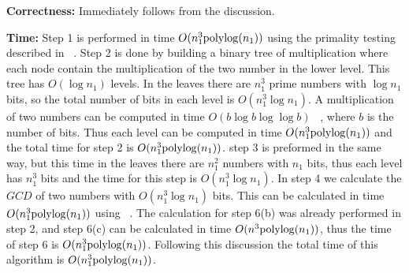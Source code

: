 \documentclass[11pt,amssymb]{article}
\begin{document}

{\bf Correctness:} Immediately follows from the discussion.

{\bf Time:} Step 1 is performed in time $O(n_1^3 {\rm polylog}(n_1))$
using the primality testing described in ~\cite{berri:02}. Step 2 is
done by building a binary tree of multiplication where each node
contain the multiplication of the two number in the lower level. This
tree has $O(\log n_1)$ levels. In the leaves there are $n_1^3$ prime
numbers with $\log n_1$ bits, so the total number of bits in each
level is $O(n_1^3 \log n_1)$. A multiplication of two numbers can be
computed in time $O(b \log b \log \log b)$ ~\cite{SS-71}, where $b$ is
the number of bits. Thus each level can be computed in time $O(n_1^3
{\rm polylog} (n_1))$ and the total time for step 2 is $O(n_1^3
{\rm polylog}(n_1))$. step 3 is preformed in the same way, but this time
in the leaves there are $n_1^2$ numbers with $n_1$ bits, thus each
level has $n_1^3$ bits and the time for this step is $O(n_1^3 \log
n_1)$. In step 4 we calculate the $GCD$ of two numbers with $O(n_1^3
\log n_1)$ bits. This can be calculated in time $O(n_1^3
{\rm polylog}(n_1))$ using ~\cite{SZ:02}. The calculation for step 6(b) was
already performed in step 2, and step 6(c) can be calculated in time
$O(n^3 {\rm polylog}(n_1))$, thus the time of step 6 is $O(n_1^3
{\rm polylog}(n_1))$. Following this discussion the total time of this
algorithm is $O(n_1^3 {\rm polylog}(n_1))$.
\end{document}
